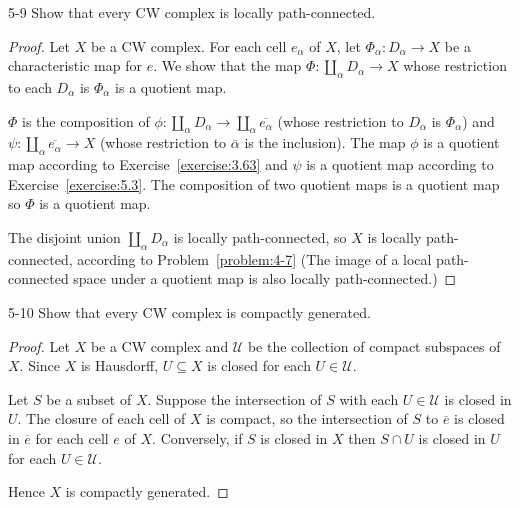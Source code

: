 \begin{problem}{5-9}\label{problem:5-9}
Show that every CW complex is locally path-connected.
\end{problem}

\begin{proof}
	Let \( X \) be a CW complex. For each cell \( e_{\alpha} \) of \( X \), let \( \Phi_{\alpha}: D_{\alpha} \to X \) be a characteristic map for \( e \). We show that the map \( \Phi: \coprod_{\alpha} D_{\alpha} \to X \) whose restriction to each \( D_{\alpha} \) is \( \Phi_{\alpha} \) is a quotient map.

	\( \Phi \) is the composition of \( \phi: \coprod_{\alpha} D_{\alpha} \to \coprod_{\alpha}\overline{e_{\alpha}} \) (whose restriction to \( D_{\alpha} \) is \( \Phi_{\alpha} \)) and \( \psi: \coprod_{\alpha}\overline{e_{\alpha}} \to X \) (whose restriction to \( \overline{\alpha} \) is the inclusion). The map \( \phi \) is a quotient map according to Exercise~\ref{exercise:3.63} and \( \psi \) is a quotient map according to Exercise~\ref{exercise:5.3}. The composition of two quotient maps is a quotient map so \( \Phi \) is a quotient map.

	The disjoint union \( \coprod_{\alpha} D_{\alpha} \) is locally path-connected, so \( X \) is locally path-connected, according to Problem~\ref{problem:4-7} (The image of a local path-connected space under a quotient map is also locally path-connected.)
\end{proof}

\begin{problem}{5-10}\label{problem:5-10}
Show that every CW complex is compactly generated.
\end{problem}

\begin{proof}
	Let \( X \) be a CW complex and \( \mathscr{U} \) be the collection of compact subspaces of \( X \). Since \( X \) is Hausdorff, \( U \subseteq X \) is closed for each \( U \in \mathscr{U} \).

	Let \( S \) be a subset of \( X \). Suppose the intersection of \( S \) with each \( U \in \mathscr{U} \) is closed in \( U \). The closure of each cell of \( X \) is compact, so the intersection of \( S \) to \( \overline{e} \) is closed in \( \overline{e} \) for each cell \( e \) of \( X \). Conversely, if \( S \) is closed in \( X \) then \( S\cap U \) is closed in \( U \) for each \( U \in \mathscr{U} \).

	Hence \( X \) is compactly generated.
\end{proof}

